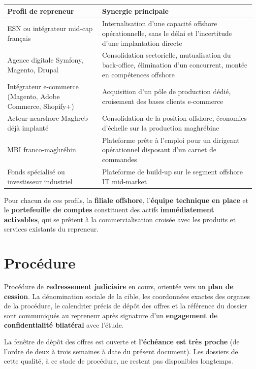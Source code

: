 \documentclass[11pt,a4paper]{article}
\begin{document}
\begin{longtable}{L{5.5cm}L{9.5cm}}
\toprule
\textbf{Profil de repreneur} & \textbf{Synergie principale} \\
\midrule
\endhead
ESN ou intégrateur mid-cap français & Internalisation d'une capacité offshore opérationnelle, sans le délai et l'incertitude d'une implantation directe \\
Agence digitale Symfony, Magento, Drupal & Consolidation sectorielle, mutualisation du back-office, élimination d'un concurrent, montée en compétences offshore \\
Intégrateur e-commerce (Magento, Adobe Commerce, Shopify+) & Acquisition d'un pôle de production dédié, croisement des bases clients e-commerce \\
Acteur nearshore Maghreb déjà implanté & Consolidation de la position offshore, économies d'échelle sur la production maghrébine \\
MBI franco-maghrébin & Plateforme prête à l'emploi pour un dirigeant opérationnel disposant d'un carnet de commandes \\
Fonds spécialisé ou investisseur industriel & Plateforme de build-up sur le segment offshore IT mid-market \\
\bottomrule
\end{longtable}

Pour chacun de ces profils, la \textbf{filiale offshore}, l'\textbf{équipe technique en place} et le \textbf{portefeuille de comptes} constituent des actifs \textbf{immédiatement activables}, qui se prêtent à la commercialisation croisée avec les produits et services existants du repreneur.

\section{Procédure}

Procédure de \textbf{redressement judiciaire} en cours, orientée vers un \textbf{plan de cession}. La dénomination sociale de la cible, les coordonnées exactes des organes de la procédure, le calendrier précis de dépôt des offres et la référence du dossier sont communiqués au repreneur après signature d'un \textbf{engagement de confidentialité bilatéral} avec l'étude.

La fenêtre de dépôt des offres est ouverte et \textbf{l'échéance est très proche} (de l'ordre de deux à trois semaines à date du présent document). Les dossiers de cette qualité, à ce stade de procédure, ne restent pas disponibles longtemps.
\end{document}
